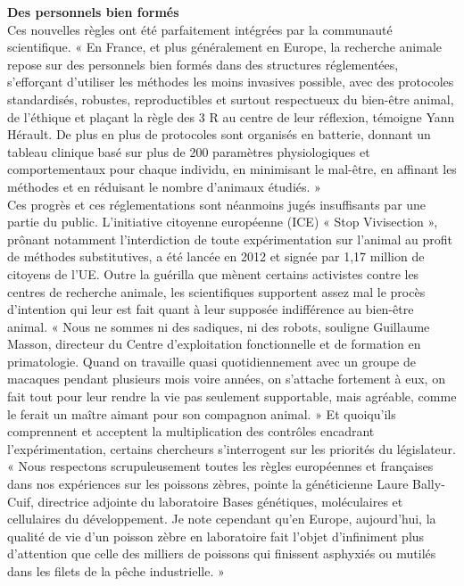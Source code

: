 \documentclass[10pt]{article}
\begin{document}
\textbf{ Des personnels bien formés}\\
 
 Ces nouvelles règles ont été parfaitement intégrées par la communauté scientifique. « En France, et plus généralement en Europe, la recherche animale repose sur des personnels bien formés dans des structures réglementées, s’efforçant d’utiliser les méthodes les moins invasives possible, avec des protocoles standardisés, robustes, reproductibles et surtout respectueux du bien-être animal, de l’éthique et plaçant la règle des 3 R au centre de leur réflexion, témoigne Yann Hérault. De plus en plus de protocoles sont organisés en batterie, donnant un tableau clinique basé sur plus de 200 paramètres physiologiques et comportementaux pour chaque individu, en minimisant le mal-être, en affinant les méthodes et en réduisant le nombre d’animaux étudiés. »\\
 
  Ces progrès et ces réglementations sont néanmoins jugés insuffisants par une partie du public. L’initiative citoyenne européenne (ICE) « Stop Vivisection », prônant notamment l’interdiction de toute expérimentation sur l’animal au profit de méthodes substitutives, a été lancée en 2012 et signée par 1,17 million de citoyens de l’UE. Outre la guérilla que mènent certains activistes contre les centres de recherche animale, les scientifiques supportent assez mal le procès d’intention qui leur est fait quant à leur supposée indifférence au bien-être animal. « Nous ne sommes ni des sadiques, ni des robots, souligne Guillaume Masson, directeur du Centre d’exploitation fonctionnelle et de formation en primatologie. Quand on travaille quasi quotidiennement avec un groupe de macaques pendant plusieurs mois voire années, on s’attache fortement à eux, on fait tout pour leur rendre la vie pas seulement supportable, mais agréable, comme le ferait un maître aimant pour son compagnon animal. » Et quoiqu’ils comprennent et acceptent la multiplication des contrôles encadrant l’expérimentation, certains chercheurs s’interrogent sur les priorités du législateur. « Nous respectons scrupuleusement toutes les règles européennes et françaises dans nos expériences sur les poissons zèbres, pointe la généticienne Laure Bally-Cuif, directrice adjointe du laboratoire Bases génétiques, moléculaires et cellulaires du développement. Je note cependant qu’en Europe, aujourd’hui, la qualité de vie d’un poisson zèbre en laboratoire fait l’objet d’infiniment plus d’attention que celle des milliers de poissons qui finissent asphyxiés ou mutilés dans les filets de la pêche industrielle. »\\
  
\end{document}
